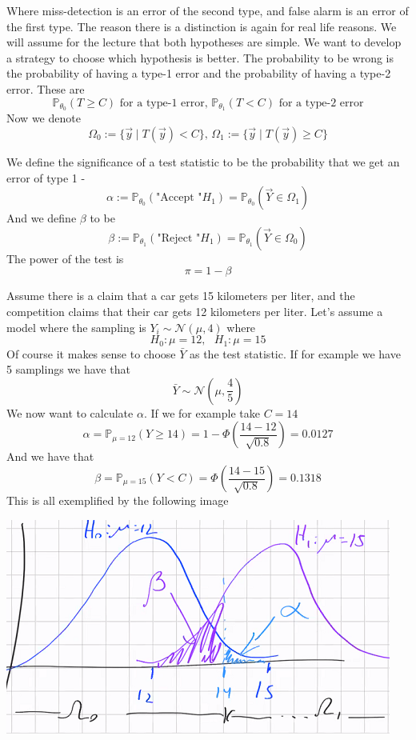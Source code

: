 \documentclass[../main.tex]{subfiles}
\begin{document}
Where miss-detection is an error of the second type, and false alarm is an error of the first type. The reason there is a distinction is again for real life reasons. We will assume for the lecture that both hypotheses are simple. We want to develop a strategy to choose which hypothesis is better. The probability to be wrong is the probability of having a type-1 error and the probability of having a type-2 error. These are
\[\mathbb{P}_{\theta_0}(T\geq C) \text{ for a type-1 error, } \mathbb{P}_{\theta_1}(T<C) \text{ for a type-2 error}\]
Now we denote
\[\Omega_0 := \{\overrightarrow{y}\mid T(\overrightarrow{y})<C\}\text{, }\Omega_1 := \{\overrightarrow{y}\mid T(\overrightarrow{y})\geq C\}\]
\begin{definition}
We define the significance of a test statistic to be the probability that we get an error of type 1 - 
\[\alpha:=\mathbb{P}_{\theta_0}(\text{"Accept "} H_1)=\mathbb{P}_{\theta_0}(\overrightarrow{Y}\in\Omega_1)\]
And we define $\beta$ to be
\[\beta:=\mathbb{P}_{\theta_1}(\text{"Reject "} H_1)=\mathbb{P}_{\theta_1}(\overrightarrow{Y}\in\Omega_0)\]
The power of the test is
\[\pi=1-\beta\]
\end{definition}
\newpage
\begin{example}
Assume there is a claim that a car gets 15 kilometers per liter, and the competition claims that their car gets 12 kilometers per liter. Let's assume a model where the sampling is $Y_i\sim\mathcal{N}(\mu, 4)$ where 
\[H_0:\mu=12,\text{ }H_1:\mu=15\]
Of course it makes sense to choose $\bar{Y}$ as the test statistic. If for example we have 5 samplings we have that
\[\bar{Y}\sim\mathcal{N}(\mu,\frac{4}{5})\]
We now want to calculate $\alpha$. If we for example take $C=14$
\[\alpha = \mathbb{P}_{\mu=12}(Y\geq 14) = 1-\Phi\left(\frac{14-12}{\sqrt{0.8}}\right) = 0.0127\]
And we have that
\[\beta = \mathbb{P}_{\mu = 15}(Y<C) = \Phi\left(\frac{14-15}{\sqrt{0.8}}\right) = 0.1318\]
This is all exemplified by the following image
\begin{center}
    \includegraphics{images/Visualization For Stat Thoery.png}
\end{center}
\end{example}
\end{document}
